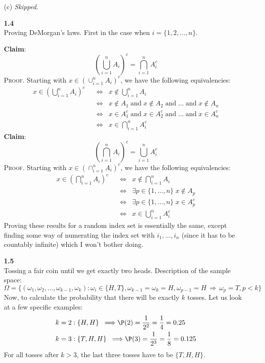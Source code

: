 \bigskip\noindent
(c) \emph{Skipped}.


\newpage\noindent
\textbf{1.4}\\  %
Proving DeMorgan's laws. First in the case when $i = \{1,2,\ldots, n\}$.

\medskip\noindent
\textbf{Claim}:
$$
\left(\bigcup_{i=1}^n A_i\right)^c = \bigcap_{i=1}^nA_i^c
$$
\textsc{Proof}. Starting with $x\in(\cup_{i=1}^n A_i)^c$, we have the following equivalencies:
\begin{align*}
    x\in \left(\bigcup_{i=1}^n A_i\right)^c
    &\;\;\Longleftrightarrow\;\;
    x\not\in \bigcup_{i=1}^n A_i \\
    &\;\;\Longleftrightarrow\;\;
    x\not\in A_1\;\text{and}\; x\not\in A_2\;\text{and}\;\ldots\;\text{and}\; x\not\in A_n \\
    &\;\;\Longleftrightarrow\;\;
    x\in A_1^c\;\text{and}\; x\in A_2^c\;\text{and}\;\ldots\;\text{and}\; x\in A_n^c \\
    &\;\;\Longleftrightarrow\;\;
    x\in \bigcap_{i=1}^nA_i^c
    \tag*{\qed}
\end{align*}
\textbf{Claim}:
$$
\left(\bigcap_{i=1}^n A_i\right)^c = \bigcup_{i=1}^nA_i^c
$$
\textsc{Proof}. Starting with $x\in(\cap_{i=1}^n A_i)^c$, we have the following equivalencies:
\begin{align*}
    x\in \left(\bigcap_{i=1}^n A_i\right)^c
    &\;\;\Longleftrightarrow\;\;
    x\not\in \bigcap_{i=1}^n A_i \\
    &\;\;\Longleftrightarrow\;\;
    \exists p\in \{1,\ldots, n\}\;x\not\in A_p \\
    &\;\;\Longleftrightarrow\;\;
    \exists p\in \{1,\ldots, n\}\;x\in A_p^c \\
    &\;\;\Longleftrightarrow\;\;
    x\in \bigcup_{i=1}^nA_i^c
    \tag*{\qed}
\end{align*}
Proving these results for a random index set is essentially the same, except finding some way of numerating the index
set with $i_1, \ldots, i_n$ (since it has to be countably infinite) which I won't bother doing.


\bigskip\noindent
\textbf{1.5}\\  %
Tossing a fair coin until we get exactly two heads. Description of the sample space:
$$
\Omega = \{(\omega_1, \omega_2, \ldots, \omega_{k-1},\omega_k) :
\omega_i\in\{H, T\}, \omega_{k-1} = \omega_k = H, \omega_{p-1} = H \,\Rightarrow\,\omega_p = T, p<k \}
$$
Now, to calculate the probability that there will be exactly $k$ tosses. Let us look at a few specific examples:
\begin{align*}
    &k=2: \{H, H\} \;\;\Longrightarrow \P(2) = \frac{1}{2^2} = \frac{1}{4} = 0.25\\
    &k=3: \{T, H, H\} \;\;\Longrightarrow \P(3) = \frac{1}{2^3} = \frac{1}{8} = 0.125
\end{align*}
For all tosses after $k> 3$, the last three tosses have to be $\{T,H,H\}$.

